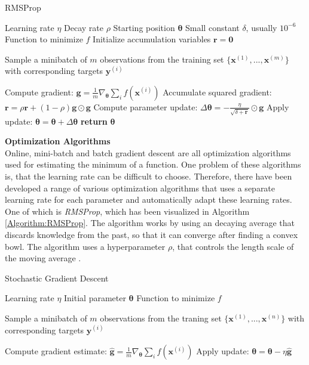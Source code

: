 \documentclass[./main.tex]{subfiles}
\begin{document}
\begin{algorithm}[htbp]
    \caption{RMSProp \cite{DeepLearning}}
    \label{Algorithm:RMSProp}
    \begin{algorithmic}[1]
        \Require Learning rate $\eta$
        \Require Decay rate $\rho$
        \Require Starting position $\bm{\theta}$
        \Require Small constant $\delta$, usually $10^{-6}$
        \Require Function to minimize $f$
        \State Initialize accumulation variables $\bm{r} = \bm{0}$
            \State \begin{varwidth}[t]{\linewidth}
            Sample a minibatch of $m$ observations from the training set $\{\bm{x}^{(1)}, ..., \bm{x}^{(m)}\}$ with corresponding targets $\bm{y}^{(i)}$
            \end{varwidth}
            \State Compute gradient: $\bm{g} = \frac{1}{m} \nabla_{\bm{\theta}} \sum_i f \left(\bm{x}^{(i)} \right)$
            \State Accumulate squared gradient: $\bm{r} = \rho \bm{r} + (1 - \rho) \bm{g} \odot \bm{g}$
            \State Compute parameter update: $\Delta\bm{\theta} = - \frac{\eta}{\sqrt{\delta + \bm{r}}} \odot \bm{g}$
            \State Apply update: $\bm{\theta} = \bm{\theta} + \Delta \bm{\theta}$ 
        \EndWhile
        \State \textbf{return} $\bm{\theta}$
    \end{algorithmic}
\end{algorithm}
\noindent \textbf{Optimization Algorithms} \\
\noindent Online, mini-batch and batch gradient descent are all optimization algorithms used for estimating the minimum of a function. One problem of these algorithms is, that the learning rate can be difficult to choose. Therefore, there have been developed a range of various optimization algorithms that uses a separate learning rate for each parameter and automatically adapt these learning rates. One of which is \textit{RMSProp}, which has been visualized in Algorithm \ref{Algorithm:RMSProp}. The algorithm works by using an decaying average that discards knowledge from the past, so that it can converge after finding a convex bowl. The algorithm uses a hyperparameter $\rho$, that controls the length scale of the moving average \cite{DeepLearning}.
\\
\begin{algorithm}[htbp]
    \caption{Stochastic Gradient Descent \cite{DeepLearning}}
    \label{Algorithm:SGD}
    \begin{algorithmic}[1]
        \Require Learning rate $\eta$
        \Require Initial parameter $\bm{\theta}$
        \Require Function to minimize $f$
            \State \begin{varwidth}[t]{\linewidth}
            Sample a minibatch of $m$ observations from the traning set $\{\bm{x}^{(1)}, ..., \bm{x}^{(n)}\}$ with corresponding targets $\bm{y}^{(i)}$
            \end{varwidth}
            \State Compute gradient estimate: $\hat{\bm{g}} = \frac{1}{m} \nabla_{\bm{\theta}} \sum_i f \left( \bm{x}^{(i)} \right)$
            \State Apply update: $\bm{\theta} = \bm{\theta} - \eta \bm{\hat{g}}$
        \EndWhile
    \end{algorithmic}
    \
\end{algorithm}
\end{document}
